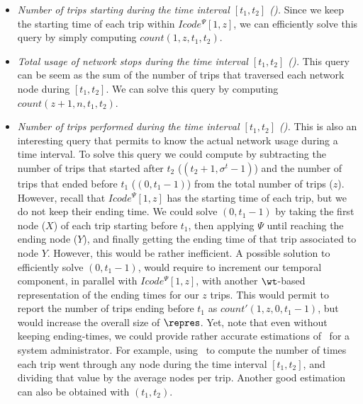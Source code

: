 \begin{itemize}[leftmargin=3mm]
\setlength{\itemindent}{0mm}


\item {\em Number of trips starting during the time interval $[t_1,t_2]$ (\Tst).} Since we keep the
starting time of each trip within $Icode^{\Psi}[1,z]$, we can efficiently solve this query 
by simply computing $count(1,z,t_1,t_2)$.

\item  {\em Total usage of network stops during the time interval $[t_1,t_2]$ (\Tut).} This query
can be seem as the sum of the number of trips that traversed each network node during $[t_1,t_2]$.
We can solve this query by computing $count(z+1,n,t_1,t_2)$. 

\item {\em Number of trips performed during the time interval $[t_1,t_2]$ (\Ttt).} This is also an
interesting query that permits to know the actual network usage during a time interval. 
To solve this query
we could compute {\em \Ttt} by subtracting the number of trips that started after $t_2$ 
(\textit{\Tst}$(t_2+1,\sigma^t-1) $) and the number of trips that ended 
before $t_1$ (\textit{\Tet}$(0,t_1-1) $) from the total number of trips ($z$). 
However, recall that
$Icode^{\Psi}[1,z]$ has the starting time of each trip, but we do not keep their ending time.
We could solve \textit{\Tet}$(0,t_1-1)$ by taking the first node ($X$) of each trip starting
before $t_1$, then applying $\Psi$ until reaching the ending node ($Y$), and finally getting the ending
time of that trip associated to node $Y$. However, this would be rather inefficient.
A possible solution to efficiently solve \textit{\Tet}$(0,t_1-1)$, would require to increment our temporal
component, in parallel with $Icode^{\Psi}[1,z]$,  with another $\wt$-based representation of the 
ending times for our $z$ trips. This would permit to report the number of trips
ending before $t_1$ as $count'(1,z,0,t_1-1)$, but would increase the overall size of $\repres$.
Yet, note that even without keeping ending-times, we could 
provide rather accurate estimations of \Ttt\ for a system administrator. For example, using \Tut\
to compute the number of times each trip went through any node during the time interval $[t_1,t_2]$, 
and dividing that value by the average nodes per trip. Another good estimation can also be obtained with 
{\em\Tst$(t_1,t_2)$}.



\end{itemize}
